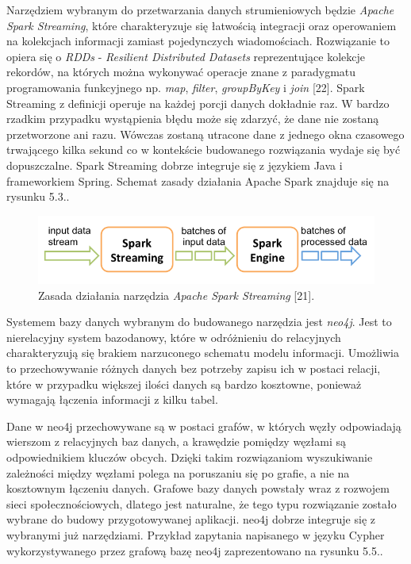 Narzędziem wybranym do przetwarzania danych strumieniowych będzie \textit{Apache Spark Streaming}, które charakteryzuje się łatwością integracji oraz operowaniem na kolekcjach informacji zamiast pojedynczych wiadomościach. Rozwiązanie to opiera się o \textit{RDDs} - \textit{Resilient Distributed Datasets} reprezentujące kolekcje rekordów, na których można wykonywać operacje znane z paradygmatu programowania funkcyjnego np. \textit{map}, \textit{filter}, \textit{groupByKey} i \textit{join} [22]. Spark Streaming z definicji operuje na każdej porcji danych dokładnie raz. W bardzo rzadkim przypadku wystąpienia błędu może się zdarzyć, że dane nie zostaną przetworzone ani razu. Wówczas zostaną utracone dane z jednego okna czasowego trwającego kilka sekund co w kontekście budowanego rozwiązania wydaje się być dopuszczalne. Spark Streaming dobrze integruje się z językiem Java i frameworkiem Spring. Schemat zasady działania Apache Spark znajduje się na rysunku 5.3..

\begin{figure}[h] %
	\centering
	\includegraphics[width=1.0\linewidth]{img/tools_apache_spark_streaming_1}
	\caption{Zasada działania narzędzia \textit{Apache Spark Streaming} [21].}
\end{figure}

Systemem bazy danych wybranym do budowanego narzędzia jest \textit{neo4j}. Jest to nierelacyjny system bazodanowy, które w odróżnieniu do relacyjnych charakteryzują się brakiem narzuconego schematu modelu informacji. Umożliwia to przechowywanie różnych danych bez potrzeby zapisu ich w postaci relacji, które w przypadku większej ilości danych są bardzo kosztowne, ponieważ wymagają łączenia informacji z kilku tabel. 

Dane w neo4j przechowywane są w postaci grafów, w których węzły odpowiadają wierszom z relacyjnych baz danych, a krawędzie pomiędzy węzłami są odpowiednikiem kluczów obcych. Dzięki takim rozwiązaniom wyszukiwanie zależności między węzłami polega na poruszaniu się po grafie, a nie na kosztownym łączeniu danych. Grafowe bazy danych powstały wraz z rozwojem sieci społecznościowych, dlatego jest naturalne, że tego typu rozwiązanie zostało wybrane do budowy przygotowywanej aplikacji. neo4j dobrze integruje się z wybranymi już narzędziami. Przykład zapytania napisanego w języku Cypher wykorzystywanego przez grafową bazę neo4j zaprezentowano na rysunku 5.5..


